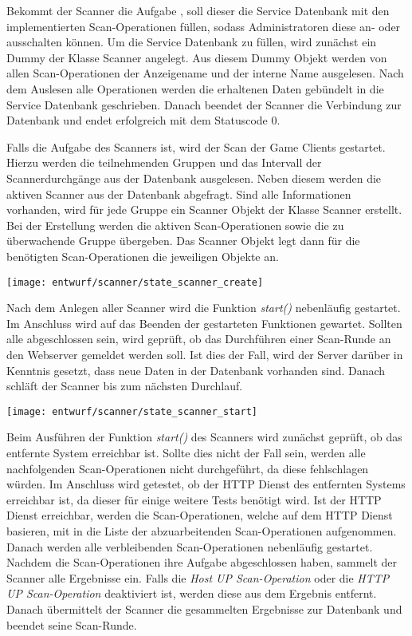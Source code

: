 Bekommt der Scanner die Aufgabe , soll dieser die Service Datenbank mit den implementierten Scan-Operationen füllen, sodass Administratoren diese an- oder ausschalten können. Um die Service Datenbank zu füllen, wird zunächst ein Dummy der Klasse Scanner angelegt. Aus diesem Dummy Objekt werden von allen Scan-Operationen der Anzeigename und der interne Name ausgelesen. Nach dem Auslesen alle Operationen werden die erhaltenen Daten gebündelt in die Service Datenbank geschrieben. Danach beendet der Scanner die Verbindung zur Datenbank und endet erfolgreich mit dem Statuscode 0.

Falls die Aufgabe des Scanners  ist, wird der Scan der Game Clients gestartet. Hierzu werden die teilnehmenden Gruppen und das Intervall der Scannerdurchgänge aus der Datenbank ausgelesen. Neben diesem werden die aktiven Scanner aus der Datenbank abgefragt. Sind alle Informationen vorhanden, wird für jede Gruppe ein Scanner Objekt der Klasse Scanner erstellt. Bei der Erstellung werden die aktiven Scan-Operationen sowie die zu überwachende Gruppe übergeben. Das Scanner Objekt legt dann für die benötigten Scan-Operationen die jeweiligen Objekte an.

\begin{center}
	\texttt{[image: entwurf/scanner/state\_scanner\_create]}
	\label{fig:scanner-create-state}
\end{center}

Nach dem Anlegen aller Scanner wird die Funktion \textit{start()} nebenläufig gestartet. Im Anschluss wird auf das Beenden der gestarteten Funktionen gewartet. Sollten alle abgeschlossen sein, wird geprüft, ob das Durchführen einer Scan-Runde an den Webserver gemeldet werden soll. Ist dies der Fall, wird der Server darüber in Kenntnis gesetzt, dass neue Daten in der Datenbank vorhanden sind. Danach schläft der Scanner bis zum nächsten Durchlauf.

\begin{center}
	\texttt{[image: entwurf/scanner/state\_scanner\_start]}
\end{center}

Beim Ausführen der Funktion \textit{start()} des Scanners wird zunächst geprüft, ob das entfernte System erreichbar ist. Sollte dies nicht der Fall sein, werden alle nachfolgenden Scan-Operationen nicht durchgeführt, da diese fehlschlagen würden. Im Anschluss wird getestet, ob der HTTP Dienst des entfernten Systems erreichbar ist, da dieser für einige weitere Tests benötigt wird. Ist der HTTP Dienst erreichbar, werden die Scan-Operationen, welche auf dem HTTP Dienst basieren, mit in die Liste der abzuarbeitenden Scan-Operationen aufgenommen. Danach werden alle verbleibenden Scan-Operationen nebenläufig gestartet. Nachdem die Scan-Operationen ihre Aufgabe abgeschlossen haben, sammelt der Scanner alle Ergebnisse ein. Falls die \textit{Host UP Scan-Operation} oder die \textit{HTTP UP Scan-Operation} deaktiviert ist, werden diese aus dem Ergebnis entfernt. Danach übermittelt der Scanner die gesammelten Ergebnisse zur Datenbank und beendet seine Scan-Runde.

